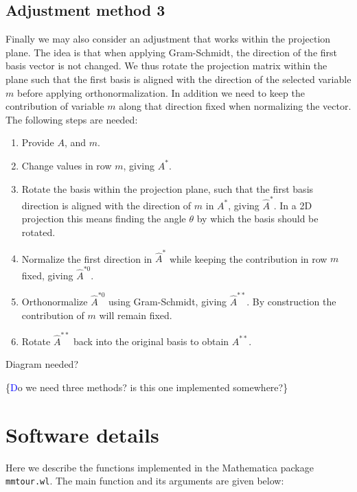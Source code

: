 \documentclass[]{interact}
\theoremstyle{plain}%
\theoremstyle{definition}
\theoremstyle{remark}
\providecommand{\tightlist}{%
  \setlength{\itemsep}{0pt}\setlength{\parskip}{0pt}}
\def\tightlist{}
\begin{document}
\hypertarget{adjustment-method-3}{%
\subsection{Adjustment method 3}\label{adjustment-method-3}}

Finally we may also consider an adjustment that works within the
projection plane. The idea is that when applying Gram-Schmidt, the
direction of the first basis vector is not changed. We thus rotate the
projection matrix within the plane such that the first basis is aligned
with the direction of the selected variable \(m\) before applying
orthonormalization. In addition we need to keep the contribution of
variable \(m\) along that direction fixed when normalizing the vector.
The following steps are needed:

\begin{enumerate}
\def\labelenumi{\arabic{enumi}.}
\tightlist
\item
  Provide \(A\), and \(m\).
\item
  Change values in row \(m\), giving \(A^*\).
\item
  Rotate the basis within the projection plane, such that the first
  basis direction is aligned with the direction of \(m\) in \(A^*\),
  giving \(\hat A^*\). In a 2D projection this means finding the angle
  \(\theta\) by which the basis should be rotated.
\item
  Normalize the first direction in \(\hat A^*\) while keeping the
  contribution in row \(m\) fixed, giving \(\hat A^{*0}\).
\item
  Orthonormalize \(\hat A^{*0}\) using Gram-Schmidt, giving
  \(\hat A^{**}\). By construction the contribution of \(m\) will remain
  fixed.
\item
  Rotate \(\hat A^{**}\) back into the original basis to obtain
  \(A^{**}\).
\end{enumerate}

Diagram needed?

\{\textcolor{blue} Do we need three methods? is this one implemented
somewhere?\}

\hypertarget{software-details}{%
\section{Software details}\label{software-details}}

Here we describe the functions implemented in the Mathematica package
\texttt{mmtour.wl}. The main function and its arguments are given below:
\end{document}
